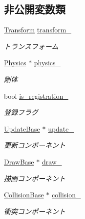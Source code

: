 \subsection*{非公開変数類}
\begin{DoxyCompactItemize}
\item 
\mbox{\hyperlink{class_transform}{Transform}} \mbox{\hyperlink{class_game_object_base_a9e84cc5213c2ee289e2ca2c8b0fc73ba}{transform\+\_\+}}
\begin{DoxyCompactList}\small\item\em トランスフォーム \end{DoxyCompactList}\item 
\mbox{\hyperlink{class_physics}{Physics}} $\ast$ \mbox{\hyperlink{class_game_object_base_a239603d2b9d165f9e666e35795a5a30c}{physics\+\_\+}}
\begin{DoxyCompactList}\small\item\em 剛体 \end{DoxyCompactList}\item 
bool \mbox{\hyperlink{class_game_object_base_a1118bad7222ee50ff135e3eddbe5b1b4}{is\+\_\+registration\+\_\+}}
\begin{DoxyCompactList}\small\item\em 登録フラグ \end{DoxyCompactList}\item 
\mbox{\hyperlink{class_update_base}{Update\+Base}} $\ast$ \mbox{\hyperlink{class_game_object_base_a2051ab9bbbc33c9307ea669f8f7b548b}{update\+\_\+}}
\begin{DoxyCompactList}\small\item\em 更新コンポーネント \end{DoxyCompactList}\item 
\mbox{\hyperlink{class_draw_base}{Draw\+Base}} $\ast$ \mbox{\hyperlink{class_game_object_base_af98b5356a668abe576a0d20a37f26e03}{draw\+\_\+}}
\begin{DoxyCompactList}\small\item\em 描画コンポーネント \end{DoxyCompactList}\item 
\mbox{\hyperlink{class_collision_base}{Collision\+Base}} $\ast$ \mbox{\hyperlink{class_game_object_base_a63c44924e1e0c90461d191fdb11f33b0}{collision\+\_\+}}
\begin{DoxyCompactList}\small\item\em 衝突コンポーネント \end{DoxyCompactList}\end{DoxyCompactItemize}


